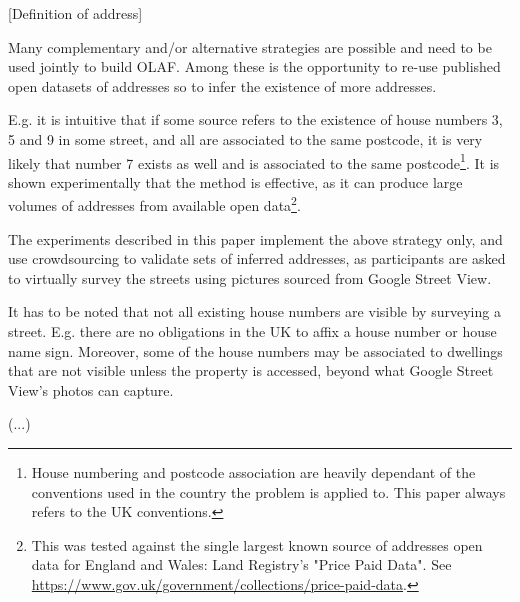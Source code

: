     {[}Definition of address{]}
    
    Many complementary and/or alternative strategies are possible and need to be used jointly to build OLAF. Among these is the opportunity to re-use published open datasets of addresses so to infer the existence of more addresses. 
    
    E.g. it is intuitive that if some source refers to the existence of house numbers 3, 5 and 9 in some street, and all are associated to the same postcode, it is very likely that number 7 exists as well and is associated to the same postcode\footnote{House numbering and postcode association are heavily dependant of the conventions used in the country the problem is applied to. This paper always refers to the UK conventions.}. It is shown experimentally that the method is effective, as it can produce large volumes of addresses from available open data\footnote{This was tested against the single largest known source of addresses open data for England and Wales: Land Registry's "Price Paid Data". See \url{https://www.gov.uk/government/collections/price-paid-data}.}.
    
    The experiments described in this paper implement the above strategy only, and  use crowdsourcing to validate sets of inferred addresses, as participants are asked to virtually survey the streets using pictures sourced from Google Street View.
    
    It has to be noted that not all existing house numbers are visible by surveying a street. E.g. there are no obligations in the UK to affix a house number or house name sign. Moreover, some of the house numbers may be associated to dwellings that are not visible unless the property is accessed, beyond what Google Street View's photos can capture.
    
    {(}...{)}